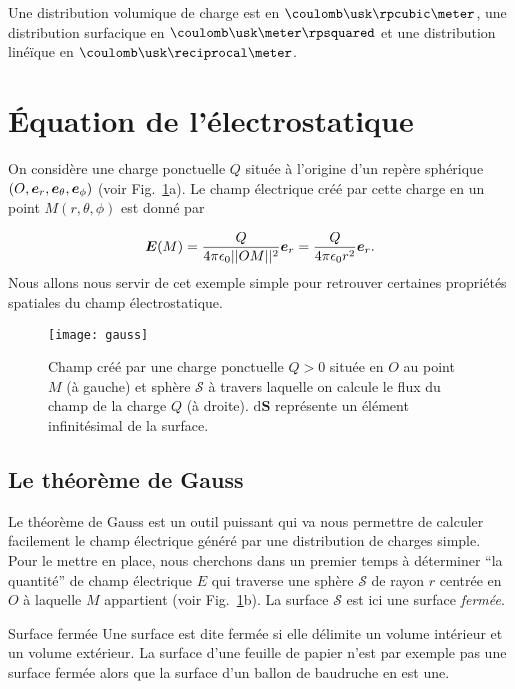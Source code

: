 \begin{attention}
	Une distribution volumique de charge est en $\coulomb \usk \rpcubic \meter$,
	une distribution surfacique en $\coulomb \usk \meter \rpsquared$
	et une distribution linéïque en $\coulomb \usk \reciprocal \meter$.
\end{attention}

\section{Équation de l'électrostatique}
On considère une charge ponctuelle $Q$ située à l'origine d'un repère sphérique
$(O, \er, \etheta, \ephi)$ (voir Fig.~\ref{fig:gauss}a). Le champ électrique créé 
par cette charge en 
un point $M(r, \theta, \phi)$ est donné par

\begin{equation*}
	\vece(M) = \dfrac{Q}{4 \pi \epsilon_0 ||OM||^2}\er 
	         = \dfrac{Q}{4\pi\epsilon_0 r^2}\er.
\end{equation*}
Nous allons nous servir de cet exemple simple pour retrouver certaines propriétés
spatiales du champ électrostatique.

\begin{figure}
	\centering
	\texttt{[image: gauss]}
	\caption{Champ créé par une charge ponctuelle $Q > 0$ située en 
		 $O$ au point $M$ (à gauche) et sphère $\mathcal{S}$ à travers
	 	 laquelle on calcule le flux du champ de la charge $Q$ (à droite).
	         $\mathrm{d}\mathbf{S}$ représente un élément infinitésimal 
	 	 de la surface.}%
	\label{fig:gauss}
\end{figure}

\subsection{Le théorème de Gauss}
\label{sec:gauss}
Le théorème de Gauss est un outil puissant qui va nous permettre de calculer
facilement le champ électrique généré par une distribution de charges simple.
Pour le mettre en place, nous
cherchons dans un premier temps à déterminer ``la quantité'' de champ électrique 
$E$ qui traverse une
sphère $\mathcal{S}$ de rayon $r$ centrée en $O$ à laquelle $M$ 
appartient (voir Fig.~\ref{fig:gauss}b). 
La surface $\mathcal{S}$ est ici une surface \emph{fermée}.

\begin{defn}{Surface fermée}
	Une surface est dite fermée si elle délimite un volume intérieur 
	et un volume extérieur. La surface d'une feuille de papier n'est par 
	exemple pas une surface fermée alors que la surface d'un ballon de baudruche
	en est une.
\end{defn}

